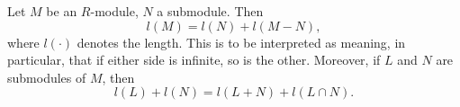 Let $M$ be an $R$-module, $N$ a submodule. Then
$$l(M) = l(N) + l(M - N),$$
where $l(\cdot)$ denotes the length. This is to be interpreted as meaning, in particular, that if either side is infinite, so is the other. Moreover, if $L$ and $N$ are submodules of $M$, then
$$l(L) + l(N) = l(L + N) + l(L \cap N).$$
